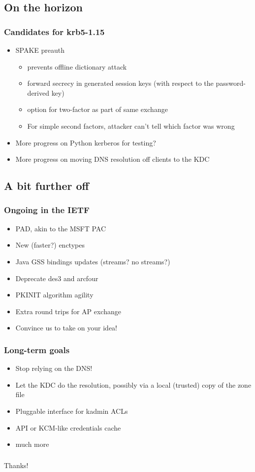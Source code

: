\documentclass{beamer}
\begin{document}
\subsection{On the horizon}

\begin{frame}
\frametitle{Candidates for krb5-1.15}
\begin{itemize}
\item{SPAKE preauth}
	\begin{itemize}
	\item{prevents offline dictionary attack}
	\item{forward secrecy in generated session keys (with respect to
		the password-derived key)}
	\item{option for two-factor as part of same exchange}
	\item{For simple second factors, attacker can't tell which factor was
		wrong}
	\end{itemize}
\pause
\item{More progress on Python kerberos for testing?}
\item{More progress on moving DNS resolution off clients to the KDC}
\end{itemize}
\end{frame}

\subsection{A bit further off}

\begin{frame}
\frametitle{Ongoing in the IETF}
\begin{itemize}
\item{PAD, akin to the MSFT PAC}
\item{New (faster?) enctypes}
\item{Java GSS bindings updates (streams?  no streams?)}
\item{Deprecate des3 and arcfour}
\item{PKINIT algorithm agility}
\item{Extra round trips for AP exchange}
\item{Convince us to take on your idea!}
\end{itemize}
\end{frame}

\begin{frame}
\frametitle{Long-term goals}
\begin{itemize}
\item{Stop relying on the DNS!}
\item{Let the KDC do the resolution, possibly via a local (trusted) copy
	of the zone file}
\item{Pluggable interface for kadmin ACLs}
\item{API or KCM-like credentials cache}
\item{much more}
\end{itemize}
\end{frame}

\begin{frame}
\frametitle{}
\Large{Thanks!}
\end{frame}
\end{document}
